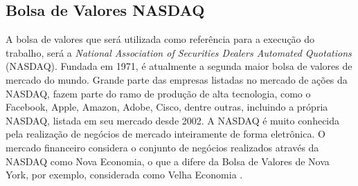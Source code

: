 \subsection{Bolsa de Valores NASDAQ}
A bolsa de valores que será utilizada como referência para a execução do trabalho, será a  \textit{National Association of Securities Dealers Automated Quotations} (NASDAQ). Fundada em 1971, é atualmente a segunda maior bolsa de valores de mercado do mundo. Grande parte das empresas listadas no mercado de ações da NASDAQ, fazem parte do ramo de produção de alta tecnologia, como o Facebook, Apple, Amazon, Adobe, Cisco, dentre outras, incluindo a própria NASDAQ, listada em seu mercado desde 2002. 
A NASDAQ é muito conhecida pela realização de negócios de mercado inteiramente de forma eletrônica. O mercado financeiro considera o conjunto de negócios realizados através da NASDAQ como Nova Economia, o que a difere da Bolsa de Valores de Nova York, por exemplo, considerada como Velha Economia \cite{christie}.
